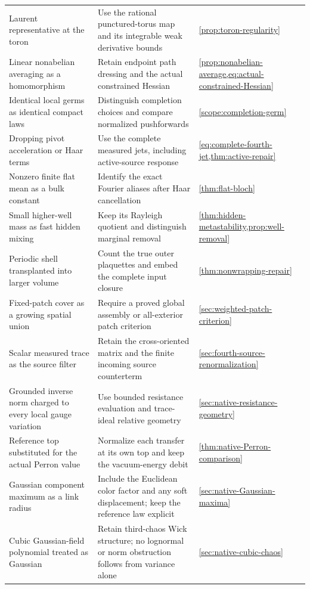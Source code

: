 \documentclass[11pt,oneside,openany]{book}
\theoremstyle{definition}
\theoremstyle{remark}
\begin{document}
\begin{longtable}{L{0.24\textwidth}L{0.49\textwidth}L{0.17\textwidth}}
Laurent representative at the toron & Use the rational punctured-torus map and its integrable weak derivative bounds & \cref{prop:toron-regularity} \\
Linear nonabelian averaging as a homomorphism & Retain endpoint path dressing and the actual constrained Hessian & \cref{prop:nonabelian-average,eq:actual-constrained-Hessian} \\
Identical local germs as identical compact laws & Distinguish completion choices and compare normalized pushforwards & \cref{scope:completion-germ} \\
Dropping pivot acceleration or Haar terms & Use the complete measured jets, including active-source response & \cref{eq:complete-fourth-jet,thm:active-repair} \\
Nonzero finite flat mean as a bulk constant & Identify the exact Fourier aliases after Haar cancellation & \cref{thm:flat-bloch} \\
Small higher-well mass as fast hidden mixing & Keep its Rayleigh quotient and distinguish marginal removal & \cref{thm:hidden-metastability,prop:well-removal} \\
Periodic shell transplanted into larger volume & Count the true outer plaquettes and embed the complete input closure & \cref{thm:nonwrapping-repair} \\
Fixed-patch cover as a growing spatial union & Require a proved global assembly or all-exterior patch criterion & \cref{sec:weighted-patch-criterion} \\
Scalar measured trace as the source filter & Retain the cross-oriented matrix and the finite incoming source counterterm & \cref{sec:fourth-source-renormalization} \\
Grounded inverse norm charged to every local gauge variation & Use bounded resistance evaluation and trace-ideal relative geometry & \cref{sec:native-resistance-geometry} \\
Reference top substituted for the actual Perron value & Normalize each transfer at its own top and keep the vacuum-energy debit & \cref{thm:native-Perron-comparison} \\
Gaussian component maximum as a link radius & Include the Euclidean color factor and any soft displacement; keep the reference law explicit & \cref{sec:native-Gaussian-maxima} \\
Cubic Gaussian-field polynomial treated as Gaussian & Retain third-chaos Wick structure; no lognormal or norm obstruction follows from variance alone & \cref{sec:native-cubic-chaos} \\

\end{longtable}
\end{document}
